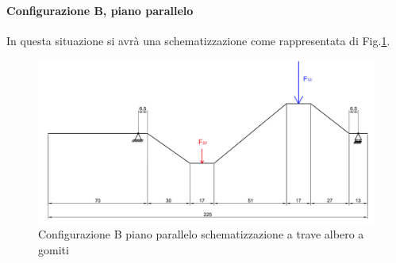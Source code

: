 \paragraph{Configurazione B, piano parallelo}
In questa situazione si avrà una schematizzazione come rappresentata di Fig.\ref{fig:SchemaAlberoBPar}.
\begin{figure}[h]
    \centering
    \includegraphics[scale=0.45]{Immagini/SchemaAlberoBPar.png}
    \caption{Configurazione B piano parallelo schematizzazione a trave albero a gomiti}
    \label{fig:SchemaAlberoBPar}
\end{figure}


